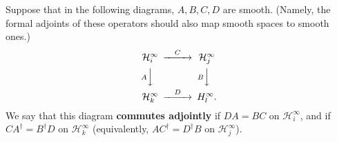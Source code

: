 \documentclass[12pt,a4paper]{article}
\theoremstyle{definition}
\theoremstyle{plain}
\newcommand{\mc}{\mathcal}
\numberwithin{equation}{subsection}
\begin{document}
Suppose that in the following diagrams, $A,B,C,D$ are smooth. (Namely, the formal adjoints of these operators should also map smooth spaces to smooth ones.) 
\begin{align}
\begin{CD}
\mc H_i^\infty @>C>> \mc H_j^\infty\\
@V A VV @V B VV\\
\mc H_k^\infty @>D>> \mc \mc H_l^\infty.
\end{CD}
\end{align}
We say that this diagram \textbf{commutes adjointly} if $DA=BC$ on $\mc H_i^\infty$, and if $CA^\dagger=B^\dagger D$ on $\mc H_k^\infty$ (equivalently, $AC^\dagger=D^\dagger B$ on $\mc H_j^\infty$).
\end{document}
